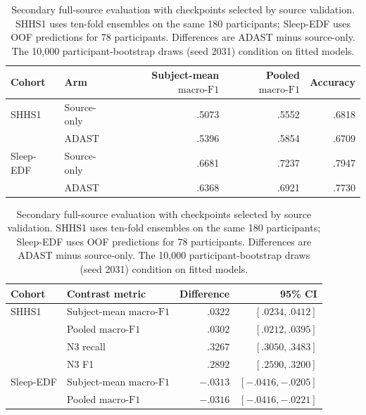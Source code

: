\documentclass[10pt,a4paper]{article}
\newcommand{\mf}{\ensuremath{\mathrm{macro\text{-}F1}}}
\begin{document}
\begin{table}[H]
\centering\small
\caption{Secondary full-source evaluation with checkpoints selected by source validation.
SHHS1 uses ten-fold ensembles on the same 180 participants; Sleep-EDF uses OOF
predictions for 78 participants. Differences are ADAST minus source-only. The
10,000 participant-bootstrap draws (seed 2031) condition on fitted models.}
\label{tab:sup_adast_fullsource_best_summary}
\begin{tabular}{llrrr}
\toprule
Cohort & Arm & Subject-mean \mf & Pooled \mf & Accuracy \\
\midrule
SHHS1 & Source-only & .5073 & .5552 & .6818 \\
 & ADAST & .5396 & .5854 & .6709 \\
Sleep-EDF & Source-only & .6681 & .7237 & .7947 \\
 & ADAST & .6368 & .6921 & .7730 \\
\bottomrule
\end{tabular}
\medskip

\begin{tabular}{llrr}
\toprule
Cohort & Contrast metric & Difference & 95\% CI \\
\midrule
SHHS1 & Subject-mean \mf & $.0322$ & $[.0234,.0412]$ \\
 & Pooled \mf & $.0302$ & $[.0212,.0395]$ \\
 & N3 recall & $.3267$ & $[.3050,.3483]$ \\
 & N3 F1 & $.2892$ & $[.2590,.3200]$ \\
Sleep-EDF & Subject-mean \mf & $-.0313$ & $[-.0416,-.0205]$ \\
 & Pooled \mf & $-.0316$ & $[-.0416,-.0221]$ \\
\bottomrule
\end{tabular}
\end{table}
\end{document}
